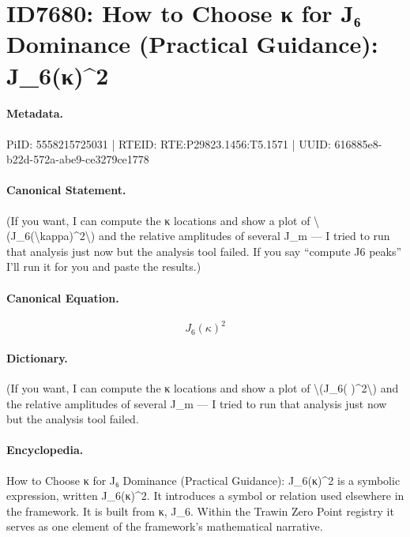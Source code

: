\section*{ID7680: How to Choose κ for J₆ Dominance (Practical Guidance): J\_6(κ)\textasciicircum{}2}
\paragraph{Metadata.}
PiID: 5558215725031 | RTEID: RTE:P29823.1456:T5.1571 | UUID: 616885e8-b22d-572a-abe9-ce3279ce1778

\paragraph{Canonical Statement.}
(If you want, I can compute the κ locations and show a plot of \textbackslash{}(J\_6(\textbackslash{}kappa)\textasciicircum{}2\textbackslash{}) and the relative amplitudes of several J\_m — I tried to run that analysis just now but the analysis tool failed. If you say “compute J6 peaks” I’ll run it for you and paste the results.)

\paragraph{Canonical Equation.}
\[
J_6(\kappa)^2
\]

\paragraph{Dictionary.}
(If you want, I can compute the κ locations and show a plot of \textbackslash{}(J\_6( )\textasciicircum{}2\textbackslash{}) and the relative amplitudes of several J\_m — I tried to run that analysis just now but the analysis tool failed.

\paragraph{Encyclopedia.}
How to Choose κ for J₆ Dominance (Practical Guidance): J\_6(κ)\textasciicircum{}2 is a symbolic expression, written J\_6(κ)\textasciicircum{}2. It introduces a symbol or relation used elsewhere in the framework. It is built from κ, J\_6. Within the Trawin Zero Point registry it serves as one element of the framework's mathematical narrative.
